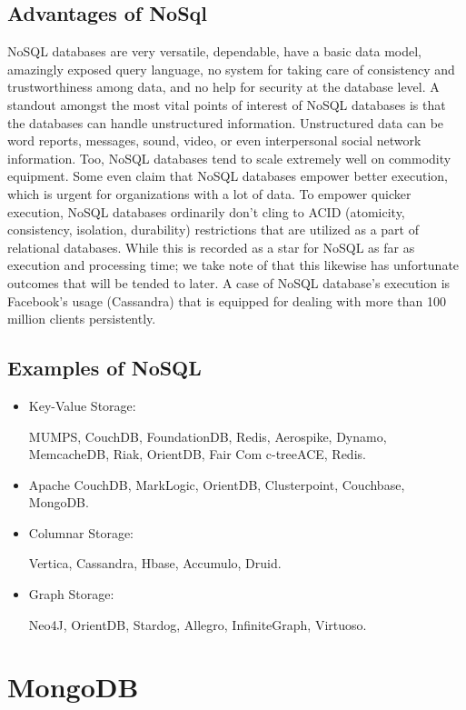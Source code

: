 \subsection{Advantages of NoSql}
NoSQL databases are very versatile, dependable, have a basic data model, amazingly exposed query language, no system for taking care of consistency and trustworthiness among data, and no help for security at the database level. A standout amongst the most vital points of interest of NoSQL databases is that the databases can handle unstructured information. Unstructured data can be word reports, messages, sound, video, or even interpersonal social network information. Too, NoSQL databases tend to scale extremely well on commodity equipment. Some even claim that NoSQL databases empower better execution, which is urgent for organizations with a lot of data. To empower quicker execution, NoSQL databases ordinarily don't cling to ACID (atomicity, consistency, isolation, durability) restrictions that are utilized as a part of relational databases. While this is recorded as a star for NoSQL as far as execution and processing time; we take note of that this likewise has unfortunate outcomes that will be tended to later. A case of NoSQL database's execution is Facebook's usage (Cassandra) that is equipped for dealing with more than 100 million clients persistently. \cite{AdvantagesnoSql}

\subsection{Examples of NoSQL}
\begin{itemize}
\item Key-Value Storage: \par
MUMPS, CouchDB, FoundationDB, Redis, Aerospike, Dynamo, MemcacheDB, Riak, OrientDB, Fair Com c-treeACE, Redis.

\item Apache CouchDB, MarkLogic, OrientDB, Clusterpoint, Couchbase, MongoDB.

\item Columnar Storage:  \par
Vertica, Cassandra, Hbase, Accumulo, Druid.

\item Graph Storage:  \par
Neo4J, OrientDB, Stardog, Allegro, InfiniteGraph, Virtuoso. 
\end{itemize}



\section{MongoDB}

